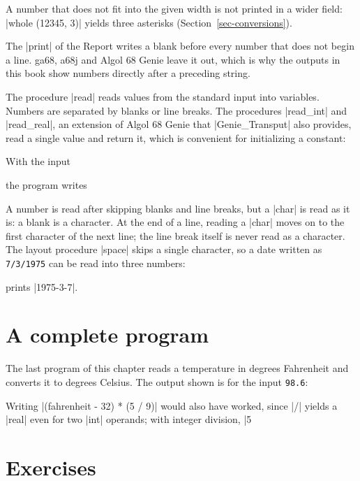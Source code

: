 
A number that does not fit into the given width is not printed in a
wider field: \code|whole (12345, 3)| yields three asterisks
(Section~\ref{sec-conversions}).

\begin{implnote}
The \code|print| of the Report writes a blank before every number that
does not begin a line. ga68, a68j and Algol 68 Genie leave it out, which
is why the outputs in this book show numbers directly after a preceding
string.
\end{implnote}

The procedure \code|read| reads values from the standard input into
variables. Numbers are separated by blanks or line breaks. The procedures
\code|read_int| and \code|read_real|, an extension of Algol 68 Genie that
\code|Genie_Transput| also provides, read a single value and return it,
which is convenient for initializing a constant:


With the input

\noindent the program writes

A number is read after skipping blanks and line breaks, but a
\code|char| is read as it is: a blank is a character. At the end of a
line, reading a \code|char| moves on to the first character of the next
line; the line break itself is never read as a character. The layout
procedure \code|space| skips a single character, so a
date written as \texttt{7/3/1975} can be read into three numbers:


\noindent prints \code|1975-3-7|.

\section{A complete program}\label{sec-complete}

The last program of this chapter reads a temperature in degrees
Fahrenheit and converts it to degrees Celsius. The output shown is for the
input \texttt{98.6}:


Writing \code|(fahrenheit - 32) * (5 / 9)| would also have worked, since
\code|/| yields a \code|real| even for two \code|int| operands; with
integer division, \code|5 %

\section*{Exercises}

